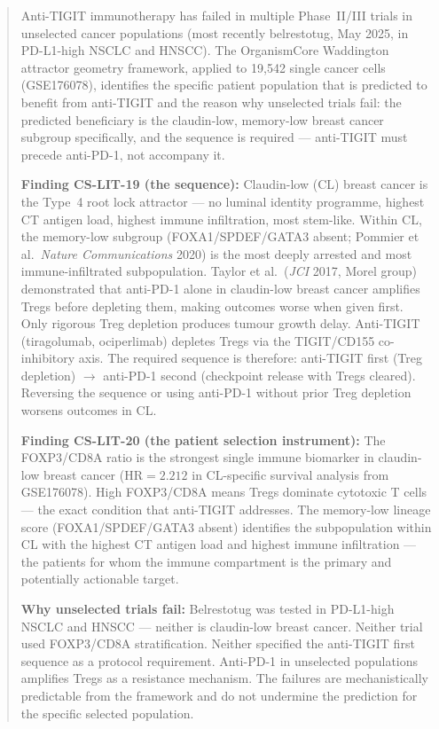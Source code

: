\documentclass[12pt, a4paper]{article}
\begin{document}
\vspace{0.8em}

\begin{abstract}
\noindent
Anti-TIGIT immunotherapy has failed in multiple
Phase~II/III trials in unselected cancer populations
(most recently belrestotug, May 2025, in PD-L1-high
NSCLC and HNSCC). The OrganismCore Waddington
attractor geometry framework, applied to 19,542 single
cancer cells (GSE176078), identifies the specific
patient population that is predicted to benefit from
anti-TIGIT and the reason why unselected trials fail:
the predicted beneficiary is the claudin-low,
memory-low breast cancer subgroup specifically, and
the sequence is required --- anti-TIGIT must precede
anti-PD-1, not accompany it.

\textbf{Finding CS-LIT-19 (the sequence):}
Claudin-low (CL) breast cancer is the Type~4 root
lock attractor --- no luminal identity programme,
highest CT antigen load, highest immune infiltration,
most stem-like. Within CL, the memory-low subgroup
(FOXA1/SPDEF/GATA3 absent; Pommier et al.\
\textit{Nature Communications} 2020) is the most
deeply arrested and most immune-infiltrated
subpopulation. Taylor et al.\ (\textit{JCI} 2017,
Morel group) demonstrated that anti-PD-1 alone in
claudin-low breast cancer amplifies Tregs before
depleting them, making outcomes worse when given
first. Only rigorous Treg depletion produces tumour
growth delay. Anti-TIGIT (tiragolumab, ociperlimab)
depletes Tregs via the TIGIT/CD155 co-inhibitory
axis. The required sequence is therefore: anti-TIGIT
first (Treg depletion) $\rightarrow$ anti-PD-1 second
(checkpoint release with Tregs cleared). Reversing
the sequence or using anti-PD-1 without prior Treg
depletion worsens outcomes in CL.

\textbf{Finding CS-LIT-20 (the patient selection
instrument):}
The FOXP3/CD8A ratio is the strongest single
immune biomarker in claudin-low breast cancer
(HR$=2.212$ in CL-specific survival analysis from
GSE176078). High FOXP3/CD8A means Tregs dominate
cytotoxic T cells --- the exact condition that
anti-TIGIT addresses. The memory-low lineage score
(FOXA1/SPDEF/GATA3 absent) identifies the
subpopulation within CL with the highest CT
antigen load and highest immune infiltration ---
the patients for whom the immune compartment is
the primary and potentially actionable target.

\textbf{Why unselected trials fail:}
Belrestotug was tested in PD-L1-high NSCLC and
HNSCC --- neither is claudin-low breast cancer.
Neither trial used FOXP3/CD8A stratification.
Neither specified the anti-TIGIT first sequence as
a protocol requirement. Anti-PD-1 in unselected
populations amplifies Tregs as a resistance mechanism.
The failures are mechanistically predictable from
the framework and do not undermine the prediction
for the specific selected population.


\end{abstract}
\end{document}
